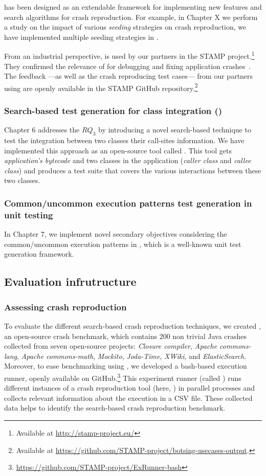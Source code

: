 \botsing has been designed as an extendable framework for implementing new features and search algorithms for crash reproduction. For example, in Chapter X we perform a study on the impact of various \emph{seeding} strategies on crash reproduction, we have implemented multiple seeding strategies in \botsing.

From an industrial perspective, \botsing is used by our partners in the STAMP project.\footnote{Available at \url{http://stamp-project.eu/}}
They confirmed the relevance of \botsing for debugging and fixing application crashes~\cite{D57}.
The feedback ---as well as the crash reproducing test cases--- from our partners using \botsing are openly available in the STAMP GitHub repository.\footnote{Available at \url{https://github.com/STAMP-project/botsing-usecases-output}.}

\subsubsection{Search-based test generation for class integration (\cling)}
Chapter 6 addresses the $RQ_3$ by introducing a novel search-based technique to test the integration between two classes their call-sites information. We have implemented this approach as an open-source tool called \cling. This tool gets \emph{application's bytecode} and two classes in the application (\emph{caller class} and \emph{callee class}) and produces a test suite that covers the various interactions between these two classes.

\subsubsection{Common/uncommon execution patterns test generation in unit testing}
In Chapter 7, we implement novel secondary objectives considering the common/uncommon execution patterns in \evosuite, which is a well-known unit test generation framework.

\subsection{Evaluation infrutructure}

\subsubsection{Assessing crash reproduction}
To evaluate the different search-based crash reproduction techniques, we created \jcrashpack, an open-source crash benchmark, which contains 200 non trivial Java crashes collected from seven open-source projects: \textit{Closure compiler}, \textit{Apache commons-lang}, \textit{Apache commons-math}, \textit{Mockito}, \textit{Joda-Time}, \textit{XWiki}, and \textit{ElasticSearch}.
Moreover, to ease benchmarking using \crashpack, we developed a bash-based execution runner, openly available on GitHub.\footnote{\url{https://github.com/STAMP-project/ExRunner-bash}} This experiment runner (called \exrunner) runs different instances of a crash reproduction tool (here, \botsing) in parallel processes and collects relevant information about the execution in a CSV file. These collected data helps to identify the search-based crash reproduction benchmark.

